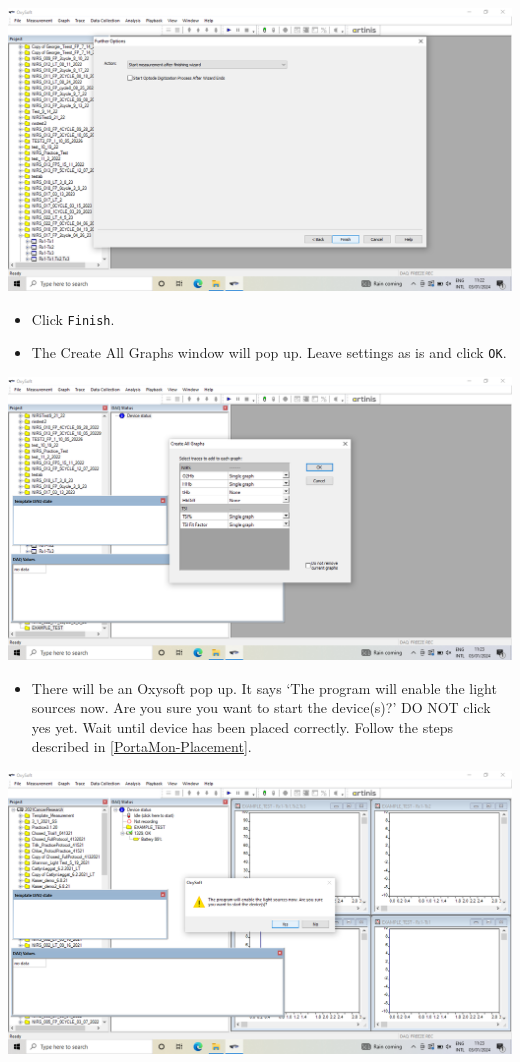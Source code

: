 \documentclass[
]{book}
\providecommand{\tightlist}{%
  \setlength{\itemsep}{0pt}\setlength{\parskip}{0pt}}
\begin{document}
\includegraphics[width=1\linewidth]{images/startnewmeasurement/15_furtheroptions_popup}

\begin{itemize}
\tightlist
\item
  Click \texttt{Finish}.
\item
  The Create All Graphs window will pop up. Leave settings as is and click \texttt{OK}.
\end{itemize}

\includegraphics[width=1\linewidth]{images/startnewmeasurement/16_create_all_graphs_popup}

\begin{itemize}
\tightlist
\item
  There will be an Oxysoft pop up. It says `The program will enable the light sources now. Are you sure you want to start the device(s)?' DO NOT click yes yet. Wait until device has been placed correctly. Follow the steps described in \ref{PortaMon-Placement}.
\end{itemize}

\includegraphics[width=1\linewidth]{images/startnewmeasurement/17_enable_light_sources_popup}
\end{document}
